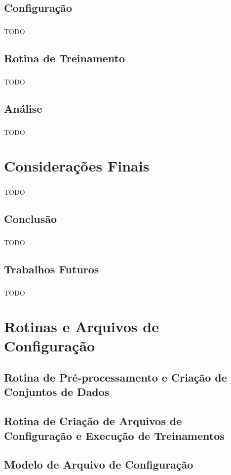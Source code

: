 \documentclass[grad,numbers]{coppe}
\begin{document}
	  \section{Configuração}
		  \paragraph{}TODO
  	\section{Rotina de Treinamento}
  		\paragraph{}TODO
 		\section{Análise}
 			\paragraph{}TODO
  
  \chapter{Considerações Finais}
  	\paragraph{}TODO
  	\section{Conclusão}
  		\paragraph{}TODO
 		\section{Trabalhos Futuros}
 			\paragraph{}TODO

  \backmatter
  
  

  \appendix

	\chapter{Rotinas e Arquivos de Configuração}
		\section{Rotina de Pré-processamento e Criação de Conjuntos de Dados}
		\section{Rotina de Criação de Arquivos de Configuração e Execução de Treinamentos}
		\section{Modelo de Arquivo de Configuração}
\end{document}
